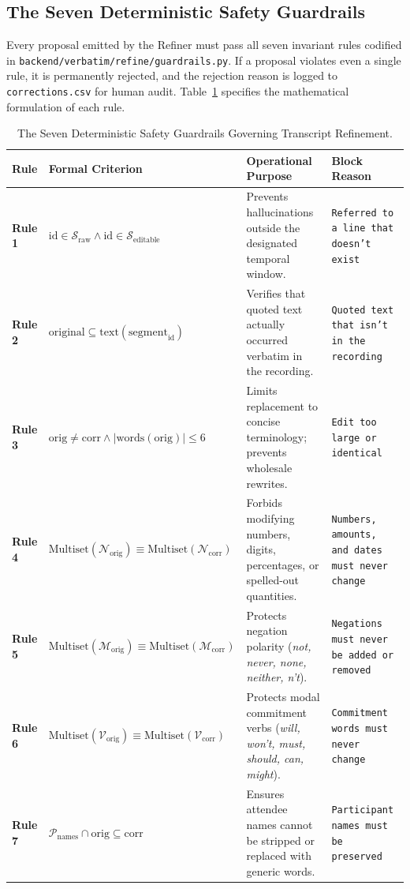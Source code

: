\documentclass[10pt,a4paper]{article}
\begin{document}
\subsection{The Seven Deterministic Safety Guardrails}
Every proposal emitted by the Refiner must pass all seven invariant rules codified in \texttt{backend/verbatim/refine/guardrails.py}. If a proposal violates even a single rule, it is permanently rejected, and the rejection reason is logged to \texttt{corrections.csv} for human audit. Table~\ref{tab:guardrails} specifies the mathematical formulation of each rule.

\begin{table}[t]
\centering
\caption{The Seven Deterministic Safety Guardrails Governing Transcript Refinement.}
\label{tab:guardrails}
\small
\begin{tabularx}{\textwidth}{l p{4.2cm} X l}
\toprule
\textbf{Rule} & \textbf{Formal Criterion} & \textbf{Operational Purpose} & \textbf{Block Reason} \\
\midrule
\textbf{Rule 1} & $\text{id} \in \mathcal{S}_{\text{raw}} \land \text{id} \in \mathcal{S}_{\text{editable}}$ & Prevents hallucinations outside the designated temporal window. & \texttt{Referred to a line that doesn't exist} \\
\textbf{Rule 2} & $\text{original} \subseteq \text{text}(\text{segment}_{\text{id}})$ & Verifies that quoted text actually occurred verbatim in the recording. & \texttt{Quoted text that isn't in the recording} \\
\textbf{Rule 3} & $\text{orig} \neq \text{corr} \land |\text{words}(\text{orig})| \le 6$ & Limits replacement to concise terminology; prevents wholesale rewrites. & \texttt{Edit too large or identical} \\
\textbf{Rule 4} & $\text{Multiset}(\mathcal{N}_{\text{orig}}) \equiv \text{Multiset}(\mathcal{N}_{\text{corr}})$ & Forbids modifying numbers, digits, percentages, or spelled-out quantities. & \texttt{Numbers, amounts, and dates must never change} \\
\textbf{Rule 5} & $\text{Multiset}(\mathcal{M}_{\text{orig}}) \equiv \text{Multiset}(\mathcal{M}_{\text{corr}})$ & Protects negation polarity (\textit{not, never, none, neither, n't}). & \texttt{Negations must never be added or removed} \\
\textbf{Rule 6} & $\text{Multiset}(\mathcal{V}_{\text{orig}}) \equiv \text{Multiset}(\mathcal{V}_{\text{corr}})$ & Protects modal commitment verbs (\textit{will, won't, must, should, can, might}). & \texttt{Commitment words must never change} \\
\textbf{Rule 7} & $\mathcal{P}_{\text{names}} \cap \text{orig} \subseteq \text{corr}$ & Ensures attendee names cannot be stripped or replaced with generic words. & \texttt{Participant names must be preserved} \\
\bottomrule
\end{tabularx}
\end{table}
\end{document}
